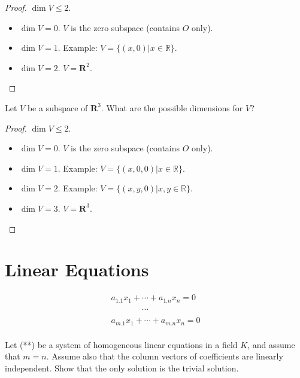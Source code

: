 \begin{proof}
    $\dim V \le 2$.
    \begin{itemize}
        \item $\dim V = 0$. $V$ is the zero subspace (contains $O$ only).
        \item $\dim V = 1$. Example: $V = \{ (x, 0) \vert x\in\mathbb{R} \}$.
        \item $\dim V = 2$. $V = \mathbf{R}^{2}$.
    \end{itemize}
\end{proof}

\begin{exercise}
    Let $V$ be a subspace of $\mathbf{R}^{3}$. What are the possible dimensions for $V$?
\end{exercise}

\begin{proof}
    $\dim V \le 2$.
    \begin{itemize}
        \item $\dim V = 0$. $V$ is the zero subspace (contains $O$ only).
        \item $\dim V = 1$. Example: $V = \{ (x, 0, 0) \vert x\in\mathbb{R} \}$.
        \item $\dim V = 2$. Example: $V = \{ (x, y, 0) \vert x, y\in\mathbb{R} \}$.
        \item $\dim V = 3$. $V = \mathbf{R}^{3}$.
    \end{itemize}
\end{proof}

\section{Linear Equations}

\begin{equation*}
    \begin{split}
        a_{1.1}x_{1} + \cdots + a_{1.n}x_{n} = 0 \\
        \phantom{a_{2.1}x_{1} + }\cdots          \\
        a_{m.1}x_{1} + \cdots + a_{m.n}x_{n} = 0 \\
    \end{split}
    \tag{(**)}
\end{equation*}

\begin{exercise}
    Let (**) be a system of homogeneous linear equations in a field $K$, and assume that $m = n$. Assume also that the column vectors of coefficients are linearly independent. Show that the only solution is the trivial solution.
\end{exercise}

